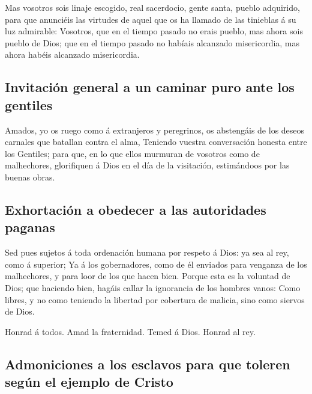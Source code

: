  Mas vosotros sois linaje escogido, real sacerdocio, gente
santa, pueblo adquirido, para que anunciéis las virtudes de aquel que os
ha llamado de las tinieblas á su luz admirable:  Vosotros,
que en el tiempo pasado no erais pueblo, mas ahora sois pueblo de Dios;
que en el tiempo pasado no habíais alcanzado misericordia, mas ahora
habéis alcanzado misericordia.

\hypertarget{invitaciuxf3n-general-a-un-caminar-puro-ante-los-gentiles}{%
\subsection{Invitación general a un caminar puro ante los
gentiles}\label{invitaciuxf3n-general-a-un-caminar-puro-ante-los-gentiles}}

 Amados, yo os ruego como á extranjeros y peregrinos, os
abstengáis de los deseos carnales que batallan contra el alma,
 Teniendo vuestra conversación honesta entre los Gentiles;
para que, en lo que ellos murmuran de vosotros como de malhechores,
glorifiquen á Dios en el día de la visitación, estimándoos por las
buenas obras.

\hypertarget{exhortaciuxf3n-a-obedecer-a-las-autoridades-paganas}{%
\subsection{Exhortación a obedecer a las autoridades
paganas}\label{exhortaciuxf3n-a-obedecer-a-las-autoridades-paganas}}

 Sed pues sujetos á toda ordenación humana por respeto á
Dios: ya sea al rey, como á superior;  Ya á los
gobernadores, como de él enviados para venganza de los malhechores, y
para loor de los que hacen bien.  Porque esta es la
voluntad de Dios; que haciendo bien, hagáis callar la ignorancia de los
hombres vanos:  Como libres, y no como teniendo la libertad
por cobertura de malicia, sino como siervos de Dios.

 Honrad á todos. Amad la fraternidad. Temed á Dios. Honrad
al rey.

\hypertarget{admoniciones-a-los-esclavos-para-que-toleren-seguxfan-el-ejemplo-de-cristo}{%
\subsection{Admoniciones a los esclavos para que toleren según el
ejemplo de
Cristo}\label{admoniciones-a-los-esclavos-para-que-toleren-seguxfan-el-ejemplo-de-cristo}}

